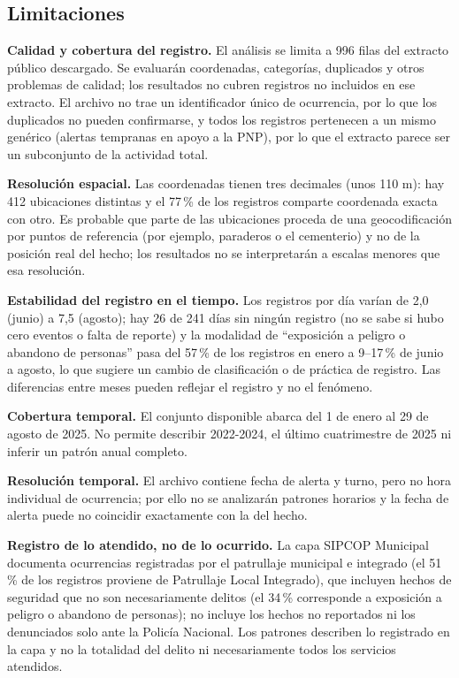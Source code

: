 \subsection{Limitaciones}

\textbf{Calidad y cobertura del registro.} El análisis se limita a 996 filas del extracto público descargado. Se evaluarán coordenadas, categorías, duplicados y otros problemas de calidad; los resultados no cubren registros no incluidos en ese extracto. El archivo no trae un identificador único de ocurrencia, por lo que los duplicados no pueden confirmarse, y todos los registros pertenecen a un mismo genérico (alertas tempranas en apoyo a la PNP), por lo que el extracto parece ser un subconjunto de la actividad total.

\textbf{Resolución espacial.} Las coordenadas tienen tres decimales (unos 110 m): hay 412 ubicaciones distintas y el 77\,\% de los registros comparte coordenada exacta con otro. Es probable que parte de las ubicaciones proceda de una geocodificación por puntos de referencia (por ejemplo, paraderos o el cementerio) y no de la posición real del hecho; los resultados no se interpretarán a escalas menores que esa resolución.

\textbf{Estabilidad del registro en el tiempo.} Los registros por día varían de 2,0 (junio) a 7,5 (agosto); hay 26 de 241 días sin ningún registro (no se sabe si hubo cero eventos o falta de reporte) y la modalidad de ``exposición a peligro o abandono de personas'' pasa del 57\,\% de los registros en enero a 9--17\,\% de junio a agosto, lo que sugiere un cambio de clasificación o de práctica de registro. Las diferencias entre meses pueden reflejar el registro y no el fenómeno.

\textbf{Cobertura temporal.} El conjunto disponible abarca del 1 de enero al 29 de agosto de 2025. No permite describir 2022-2024, el último cuatrimestre de 2025 ni inferir un patrón anual completo.

\textbf{Resolución temporal.} El archivo contiene fecha de alerta y turno, pero no hora individual de ocurrencia; por ello no se analizarán patrones horarios y la fecha de alerta puede no coincidir exactamente con la del hecho.

\textbf{Registro de lo atendido, no de lo ocurrido.} La capa SIPCOP Municipal documenta ocurrencias registradas por el patrullaje municipal e integrado (el 51\,\% de los registros proviene de Patrullaje Local Integrado), que incluyen hechos de seguridad que no son necesariamente delitos (el 34\,\% corresponde a exposición a peligro o abandono de personas); no incluye los hechos no reportados ni los denunciados solo ante la Policía Nacional. Los patrones describen lo registrado en la capa y no la totalidad del delito ni necesariamente todos los servicios atendidos.

